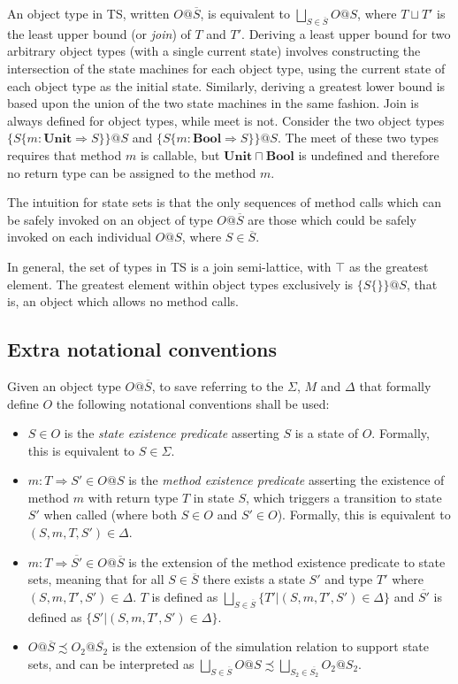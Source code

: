 \documentclass[preprint]{sigplanconf}
\newcommand{\unitt}{\mathbf{Unit}}
\newcommand{\boolt}{\mathbf{Bool}}
\begin{document}
An object type in TS, written $O@\overline{S}$, is equivalent to
$\bigsqcup_{S \in \overline{S}} O@S$, where $T \sqcup T'$ is the least upper
bound (or {\it join}) of $T$ and $T'$. Deriving a least upper bound for
two arbitrary object types (with a single current state) 
involves constructing the intersection of the state machines for each object 
type, using the current state of each object type as the initial state.
Similarly, deriving a greatest lower bound is based upon the union of
the two state machines in the same fashion. Join is always defined for
object types, while meet is not. Consider the two object types
$\{ S \{ m : \unitt \Rightarrow S \} \}@S$ and
$\{ S \{ m : \boolt \Rightarrow S \} \}@S$. The meet of these two types
requires that method $m$ is callable, but $\unitt \sqcap \boolt$ is undefined
and therefore no return type can be assigned to the method $m$.

The intuition for state sets is that the only sequences of method calls which 
can be safely invoked on an object of type $O@\overline{S}$ are those which 
could be safely invoked on each individual $O@S$, where $S \in \overline{S}$.

In general, the set of
types in TS is a join semi-lattice, with $\top$ as the greatest element.
The greatest element within object types exclusively is $\{ S \{\} \}@S$,
that is, an object which allows no method calls.


\subsection{Extra notational conventions}

Given an object type $O@\overline{S}$, to save
referring to the $\Sigma$, $M$ and $\Delta$ that formally define $O$
the following notational conventions shall be used:

\begin{itemize}
\item $S \in O$ is the {\it state existence predicate} asserting 
$S$ is a state of $O$. 
Formally, this is equivalent to $S \in \Sigma$.
\item $m : T \Rightarrow S' \in O@S$ is the {\it method existence predicate} 
asserting the existence
of method $m$ with return type $T$ in state $S$, which triggers a 
transition to state $S'$ when called (where both $S \in O$ and $S' \in O$). 
Formally, this is equivalent to $(S,m,T,S') \in \Delta$.
\item $m : T \Rightarrow \overline{S'} \in O@\overline{S}$ is the extension
of the method existence predicate to state sets, meaning that for all 
$S \in \overline{S}$ there exists a state $S'$ and type 
$T'$ where $(S,m,T',S') \in \Delta$.
$T$ is defined as 
$\bigsqcup_{S \in \overline{S}} \{ T' | (S,m,T',S') \in \Delta \}$
and $\overline{S'}$ is defined as $\{ S' | (S,m,T',S') \in \Delta \}$.
\item $O@\overline{S} \precsim O_2@\overline{S_2}$ is the extension of the
simulation relation to support state sets, and can be interpreted as
$\bigsqcup_{S \in \overline{S}}O@S \precsim \bigsqcup_{S_2 \in \overline{S_2}}O_2@S_2$.
\end{itemize}
\end{document}

